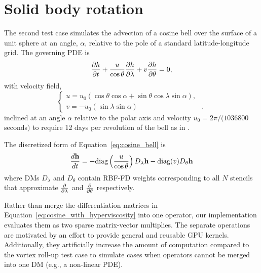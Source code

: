 \documentclass{report}
\begin{document}

\section{Solid body rotation}
\label{sec:cosine_bell}

The second test case simulates the advection of a cosine bell over the surface of a unit sphere at an angle, $\alpha$, relative to the pole of a standard latitude-longitude grid. The governing PDE is
\begin{equation}
\frac{\partial h}{\partial t} + \frac{u}{\cos \theta} \frac{\partial h}{\partial \lambda} + v \frac{\partial h}{\partial \theta} = 0, \label{eq:cosine_bell}
\end{equation}
with velocity field,
\begin{equation*}
\begin{cases}
u =  u_0 (\cos \theta \cos \alpha + \sin \theta \cos \lambda \sin \alpha),  & \\
v =  -u_0(\sin \lambda \sin \alpha) &.
\end{cases}
\end{equation*}
inclined at an angle $\alpha$ relative to the polar axis and velocity $u_0 = 2 \pi / (1036800$ seconds$)$ to require 12 days per revolution of the bell as in \cite{NairTransport05, FlyerWright07}.

The discretized form of Equation~\ref{eq:cosine_bell} is
\begin{equation}
\frac{d \mathbf{h}}{d t} = -\text{diag}\left(\frac{u}{\cos \theta}\right) D_\lambda \mathbf{h} - \text{diag}(v) D_\theta \mathbf{h}
\label{eq:cosine_with_hyperviscosity}
\end{equation}
where DMs $D_\lambda$ and $D_\theta$ contain RBF-FD weights corresponding to all $N$ stencils that approximate $\frac{\partial }{\partial \lambda}$ and $\frac{\partial }{\partial \theta}$ respectively. 

Rather than merge the differentiation matrices in Equation~\ref{eq:cosine_with_hyperviscosity} into one operator, our implementation evaluates them as two sparse matrix-vector multiplies. The separate operations are motivated by an effort to provide general and reusable GPU kernels. Additionally, they artificially increase the amount of computation compared to the vortex roll-up test case to simulate cases when operators cannot be merged into one DM (e.g., a non-linear PDE).
\end{document}
